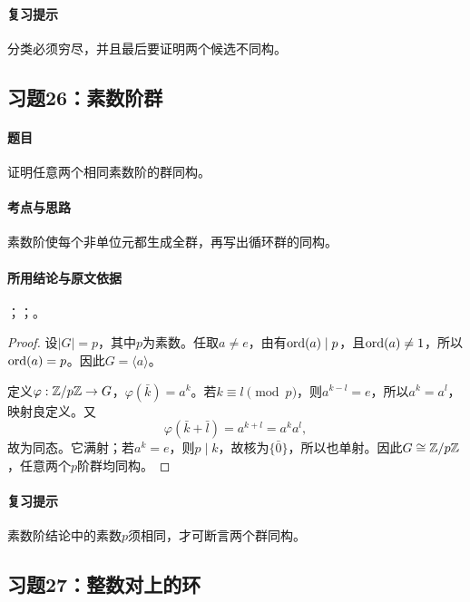 \paragraph{复习提示}
分类必须穷尽，并且最后要证明两个候选不同构。


\subsection{习题26：\texorpdfstring{素数阶群}{素数阶群}}
\label{ex:1:26}

\paragraph{题目}
证明任意两个相同素数阶的群同构。

\paragraph{考点与思路}
素数阶使每个非单位元都生成全群，再写出循环群的同构。

\paragraph{所用结论与原文依据}
；；。


\begin{proof}
设$|G|=p$，其中$p$为素数。任取$a\ne e$，由有$\operatorname{ord}(a)\mid p$，且$\operatorname{ord}(a)\ne1$，所以$\operatorname{ord}(a)=p$。因此$G=\langle a\rangle$。

定义$\varphi:\mathbb Z/p\mathbb Z\to G$，$\varphi(\bar k)=a^k$。若$k\equiv l\pmod p$，则$a^{k-l}=e$，所以$a^k=a^l$，映射良定义。又
\[
\varphi(\bar k+\bar l)=a^{k+l}=a^ka^l,
\]
故为同态。它满射；若$a^k=e$，则$p\mid k$，故核为$\{\bar0\}$，所以也单射。因此$G\cong\mathbb Z/p\mathbb Z$，任意两个$p$阶群均同构。
\end{proof}

\paragraph{复习提示}
素数阶结论中的素数$p$须相同，才可断言两个群同构。


\subsection{习题27：\texorpdfstring{整数对上的环}{整数对上的环}}
\label{ex:1:27}

